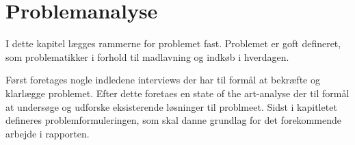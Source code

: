 \chapter{Problemanalyse}\label{chapter:problemanalyse}
I dette kapitel lægges rammerne for problemet fast.
Problemet er goft defineret, som problematikker i forhold til madlavning og indkøb i hverdagen.

Først foretages nogle indledene interviews der har til formål at bekræfte og klarlægge problemet.
Efter dette foretaes en state of the art-analyse der til formål at undersøge og udforske eksisterende løsninger til problmeet.
Sidst i kapitletet defineres problemformuleringen, som skal danne grundlag for det forekommende arbejde i rapporten.




